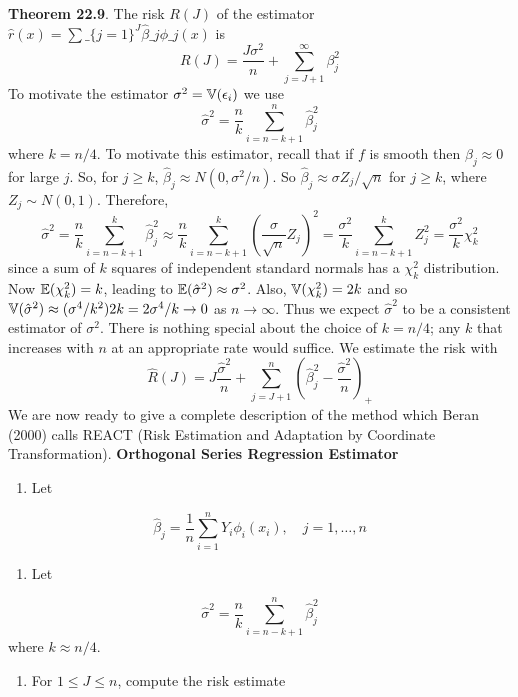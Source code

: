 \textbf{Theorem 22.9}. The risk \(R(J)\) of the estimator $ \hat{r}(x)
= \sum\_\{j=1\}^{J} \hat{\beta}\_{j} \phi\_{j}(x) $ is
\[
R(J) = \frac{J \sigma^{2}}{n} + \sum_{j=J+1}^{\infty} \beta_{j}^{2}
\]
To motivate the estimator \(\sigma^{2} = \operatorname{\mathbb{V}}(\epsilon_{i})\) we use
\[
\hat{\sigma}^{2} = \frac{n}{k} \sum_{i=n - k + 1}^{n} \hat{\beta}_{j}^{2}
\]
where \(k = n / 4\). To motivate this estimator, recall that if \(f\) is
smooth then \(\beta_{j} \approx 0\) for large \(j\). So, for \(j \geq k\),
\(\hat{\beta}_{j} \approx N(0, \sigma^{2} / n)\). So
\(\hat{\beta}_{j} \approx \sigma Z_{j} / \sqrt{n}\) for \(j \geq k\), where
\(Z_{j} \sim N(0, 1)\). Therefore,
\[
\hat{\sigma}^{2} = \frac{n}{k} \sum_{i=n-k+1}^{k} \hat{\beta}_{j}^{2} \approx \frac{n}{k} \sum_{i=n-k+1}^{k} \left( \frac{\sigma}{\sqrt{n}} Z_{j} \right)^{2} = \frac{\sigma^{2}}{k} \sum_{i=n-k+1}^{k} Z_{j}^{2} = \frac{\sigma^{2}}{k} \chi_{k}^{2}
\]
since a sum of \(k\) squares of independent standard normals has a
\(\chi_{k}^{2}\) distribution. Now \(\operatorname{\mathbb{E}}(\chi_{k}^{2}) = k\), leading to
\(\operatorname{\mathbb{E}}(\hat{\sigma}^{2}) \approx \sigma^{2}\). Also,
\(\operatorname{\mathbb{V}}(\chi_{k}^{2}) = 2k\) and so
\(\operatorname{\mathbb{V}}(\hat{\sigma}^{2}) \approx (\sigma^{4} / k^{2}) 2k = 2\sigma^{4} / k \rightarrow 0\)
as \(n \rightarrow \infty\). Thus we expect \(\hat{\sigma}^{2}\) to be a
consistent estimator of \(\sigma^{2}\).
There is nothing special about the choice of \(k = n / 4\); any \(k\)
that increases with \(n\) at an appropriate rate would suffice.
We estimate the risk with
\[
\hat{R}(J) = J \frac{\hat{\sigma}^{2}}{n} + \sum_{j=J+1}^{n} \left(\hat{\beta}_{j}^{2} - \frac{\hat{\sigma}^{2}}{n} \right)_{+}
\]
We are now ready to give a complete description of the method which
Beran (2000) calls REACT (Risk Estimation and Adaptation by Coordinate
Transformation).
\textbf{Orthogonal Series Regression Estimator}
\begin{enumerate}[tightlist,label={\arabic*.}]
\item
  Let
\end{enumerate}
\[
\hat{\beta}_{j} = \frac{1}{n} \sum_{i=1}^{n} Y_{i} \phi_{i}(x_{i}), \quad j = 1, \dots, n
\]
\begin{enumerate}[tightlist,label={\arabic*.}]
\item
  Let
\end{enumerate}
\[
\hat{\sigma}^{2} = \frac{n}{k} \sum_{i=n-k+1}^{n} \hat{\beta}_{j}^{2}
\]
where \(k \approx n / 4\).
\begin{enumerate}[tightlist,label={\arabic*.},resume]
\item
  For \(1 \leq J \leq n\), compute the risk estimate
\end{enumerate}
